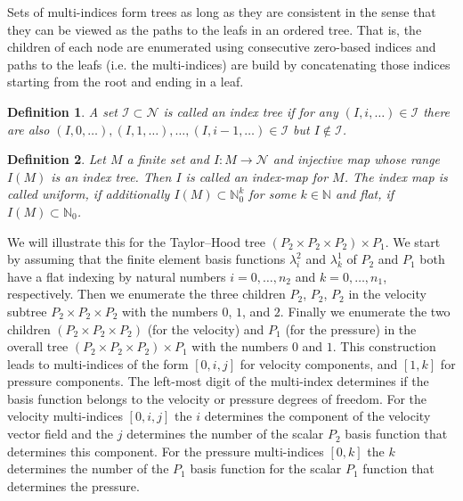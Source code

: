 \documentclass[a4paper,10pt,headings=normal,bibliography=totoc]{scrartcl}
\newtheorem{definition}{Definition}
\begin{document}
Sets of multi-indices form trees as long as they are consistent in the sense that they
can be viewed as the paths to the leafs in an ordered tree.
That is, the children of each node are enumerated using consecutive zero-based
indices and paths to the leafs (i.e. the multi-indices) are build by concatenating
those indices starting from the root and ending in a leaf.

\begin{definition}
 A set $\mathcal{I} \subset \mathcal{N}$ is called an \emph{index tree}
 if for any $(I,i,\dots) \in \mathcal{I}$ there are also $(I,0,\dots),(I,1,\dots),\dots,(I,i-1,\dots) \in \mathcal{I}$
 but $I \notin \mathcal{I}$.
\end{definition}

\begin{definition}
  Let $M$ a finite set and $I:M \to \mathcal{N}$ and injective map whose range
  $I(M)$ is an index tree.
  Then $I$ is called an \emph{index-map} for $M$.
  The index map is called \emph{uniform}, if additionally $I(M) \subset \mathbb{N}^k_0$ for some $k \in \mathbb{N}$
  and \emph{flat}, if $I(M) \subset \mathbb{N}_0$.
\end{definition}


We will illustrate this for the Taylor--Hood tree $(P_2 \times P_2 \times P_2) \times P_1$.
We start by assuming that the finite element basis functions $\lambda_i^2$ and $\lambda_k^1$
of $P_2$ and $P_1$ both
have a flat indexing by natural numbers $i=0,\dots,n_2$ and $k=0,\dots,n_1$,
respectively.
Then we enumerate the three children $P_2$, $P_2$, $P_2$
in the velocity subtree $P_2 \times P_2 \times P_2$
with the numbers $0$, $1$, and $2$.
Finally we enumerate the two children $(P_2 \times P_2 \times P_2)$ (for the velocity)
and $P_1$ (for the pressure) in the overall tree $(P_2 \times P_2 \times P_2) \times P_1$
with the numbers $0$ and $1$.
This construction leads to multi-indices of the form $[0,i,j]$ for velocity components, and $[1,k]$
for pressure components.
The left-most digit of the multi-index determines if the basis function
belongs to the velocity or pressure degrees of freedom.
For the velocity multi-indices $[0,i,j]$ the $i$ determines the component
of the velocity vector field and the $j$ determines the number of the scalar $P_2$ basis
function that determines this component.
For the pressure multi-indices $[0,k]$ the $k$ determines the number of the $P_1$ basis
function for the scalar $P_1$ function that determines the pressure.
\end{document}
